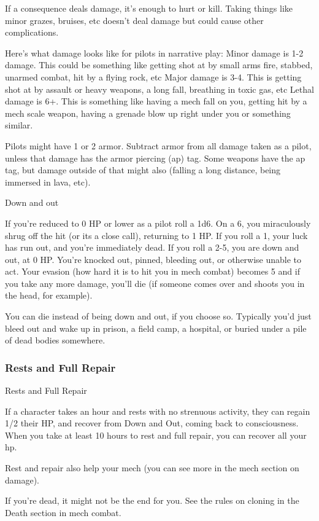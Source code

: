 If a consequence deals damage, it’s enough to hurt or kill. Taking things like minor grazes,
bruises, etc doesn’t deal damage but could cause other complications.

Here’s what damage looks like for pilots in narrative play:
Minor damage is 1-2 damage. This could be something like getting shot at by small arms fire,
stabbed, unarmed combat, hit by a flying rock, etc
Major damage is 3-4. This is getting shot at by assault or heavy weapons, a long fall, breathing
in toxic gas, etc
Lethal damage is 6+. This is something like having a mech fall on you, getting hit by a mech
scale weapon, having a grenade blow up right under you or something similar.

Pilots might have 1 or 2 armor. Subtract armor from all damage taken as a pilot, unless that
damage has the armor piercing (ap) tag. Some weapons have the ap tag, but damage outside of
that might also (falling a long distance, being immersed in lava, etc).

                                                 Down and out




If you’re reduced to 0 HP or lower as a pilot roll a 1d6. On a 6, you miraculously shrug off the hit
(or its a close call), returning to 1 HP. If you roll a 1, your luck has run out, and you’re immediately
dead. If you roll a 2-5, you are down and out, at 0 HP. You’re knocked out, pinned, bleeding out,
or otherwise unable to act. Your evasion (how hard it is to hit you in mech combat) becomes 5
and if you take any more damage, you’ll die (if someone comes over and shoots you in the head,
for example).


You can die instead of being down and out, if you choose so. Typically you’d just bleed out and
wake up in prison, a field camp, a hospital, or buried under a pile of dead bodies somewhere.

\subsubsection{Rests and Full Repair}

                                         Rests and Full Repair

If a character takes an hour and rests with no strenuous activity, they can regain 1/2 their HP, and
recover from Down and Out, coming back to consciousness. When you take at least 10 hours to
rest and full repair, you can recover all your hp.


Rest and repair also help your mech (you can see more in the mech section on damage).


If you’re dead, it might not be the end for you. See the rules on cloning in the Death section in
mech combat.